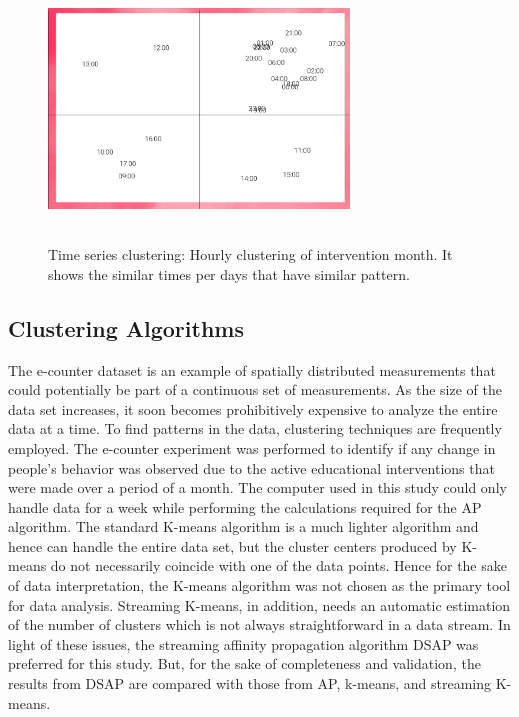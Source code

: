 \begin{figure}[!h]
\centering
\includegraphics[width = 8cm,height = 7cm]{image/res.png}
\caption{Time series clustering: Hourly clustering of intervention month. It shows the similar times per days that have similar pattern. } 
\label{timegrup}
\end{figure}




\subsection{Clustering Algorithms}

The e-counter dataset is an example of spatially distributed measurements that could potentially be part of a continuous set of measurements. As the size of the data set increases, it soon becomes prohibitively expensive to analyze the entire data at a time. To find patterns in the data, clustering techniques are frequently employed. The e-counter experiment was performed to identify if any change in people's behavior was observed due to the active educational interventions that were made over a period of a month. The computer used in this study could only handle data for a week while performing the calculations required for the AP algorithm. The standard K-means algorithm is a much lighter algorithm and hence can handle the entire data set, but the cluster centers produced by K-means do not necessarily coincide with one of the data points. Hence for the sake of data interpretation, the K-means algorithm was not chosen as the primary tool for data analysis. Streaming K-means, in addition, needs an automatic estimation of the number of clusters which is not always straightforward in a data stream. In light of these issues, the streaming affinity propagation algorithm  DSAP was preferred for this study. But, for the sake of completeness and validation, the results from DSAP are compared with those from AP, k-means, and streaming K-means.    




